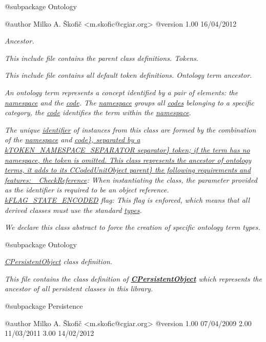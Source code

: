 {\itshape \begin{DoxyVerb} @subpackage        Ontology

 @author            Milko A. Škofič <m.skofic@cgiar.org>
 @version   1.00 16/04/2012\end{DoxyVerb}
}

{\itshape Ancestor.}

{\itshape This include file contains the parent class definitions. Tokens.}

{\itshape This include file contains all default token definitions. Ontology term ancestor.}

{\itshape An ontology term represents a concept identified by a pair of elements\-: the \hyperlink{}{namespace} and the \hyperlink{}{code}. The \hyperlink{}{namespace} groups all \hyperlink{}{codes} belonging to a specific category, the \hyperlink{}{code} identifies the term within the \hyperlink{}{namespace}.}

{\itshape The unique \hyperlink{}{identifier} of instances from this class are formed by the combination of the \hyperlink{}{namespace} and \hyperlink{}{code\}, separated by a  k\-T\-O\-K\-E\-N\-\_\-\-N\-A\-M\-E\-S\-P\-A\-C\-E\-\_\-\-S\-E\-P\-A\-R\-A\-T\-O\-R separator\} token; if the term has no namespace, the token is omitted. This class represents the ancestor of ontology terms, it adds to its  C\-Coded\-Unit\-Object parent\} the following requirements and features\-: } {\itshape \hyperlink{}{\-\_\-\-Check\-Reference}}\-: When instantiating the class, the parameter provided as the identifier is required to be an object reference. {\itshape \hyperlink{}{k\-F\-L\-A\-G\-\_\-\-S\-T\-A\-T\-E\-\_\-\-E\-N\-C\-O\-D\-E\-D} flag}\-: This flag is enforced, which means that all derived classes must use the standard \hyperlink{class_c_data_type}{types}. }

{\itshape We declare this class abstract to force the creation of specific ontology term types.}

{\itshape \begin{DoxyVerb} @subpackage        Ontology\end{DoxyVerb}
}

{\itshape {\itshape \hyperlink{class_c_persistent_object}{C\-Persistent\-Object}} class definition.}

{\itshape This file contains the class definition of {\bfseries \hyperlink{class_c_persistent_object}{C\-Persistent\-Object}} which represents the ancestor of all persistent classes in this library.}

{\itshape \begin{DoxyVerb} @subpackage        Persistence

 @author            Milko A. Škofič <m.skofic@cgiar.org>
 @version   1.00 07/04/2009
                    2.00 11/03/2011
                    3.00 14/02/2012\end{DoxyVerb}
}

